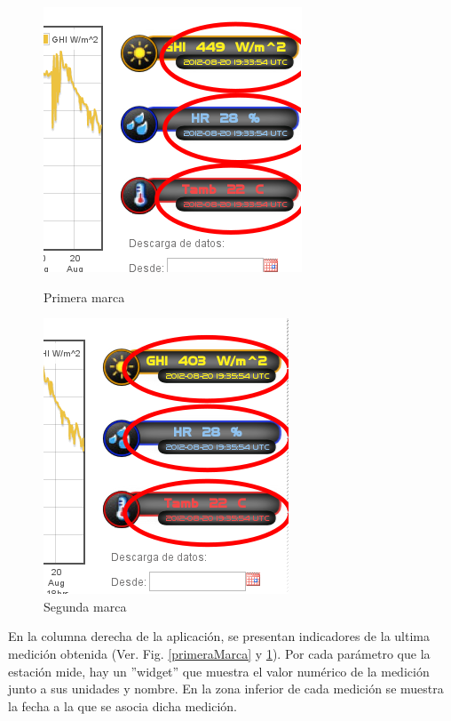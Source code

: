\begin{figure}[h]
	\begin{minipage}[b]{0.45\linewidth}
		\centering
		\includegraphics[scale=0.5]{./images/cap5chap1img5-1}
		\caption{Primera marca}
		\label{primeraMarca}
	\end{minipage}
	\begin{minipage}[b]{0.45\linewidth}
		\centering
                \includegraphics[scale=0.5]{./images/cap5chap1img5-2}
                \caption{Segunda marca}
                \label{segundaMarca}
	\end{minipage}
\end{figure}
En la columna derecha de la aplicación, se presentan indicadores de la ultima medición obtenida (Ver. Fig. \ref{primeraMarca} y \ref{segundaMarca}). Por cada parámetro que la estación mide, hay un ''widget'' que muestra el valor numérico de la medición junto a sus unidades y nombre. En la zona inferior de cada medición se muestra la fecha a la que se asocia dicha medición.

